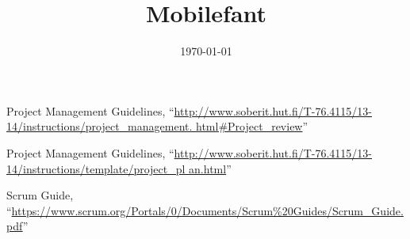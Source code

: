 \documentclass[fontsize=10pt, toc=bibliographynumbered, paper=A4, pagesize]{scrartcl}
\begin{document}
\subject{Project Plan}
\title{Mobilefant}
\author{}
\date{\today}
\maketitle
\thispagestyle{empty}
\newpage

\tableofcontents
\newpage



\begin{thebibliography}{9}

	Project Management Guidelines, 
``\url{http://www.soberit.hut.fi/T-76.4115/13-14/instructions/project_management.
html#Project_review}''
	
		Project Management Guidelines, 
``\url{http://www.soberit.hut.fi/T-76.4115/13-14/instructions/template/project_pl
an.html}''

Scrum Guide, 
``\url{https://www.scrum.org/Portals/0/Documents/Scrum%20Guides/Scrum_Guide.pdf}''

\end{thebibliography}
\end{document}
